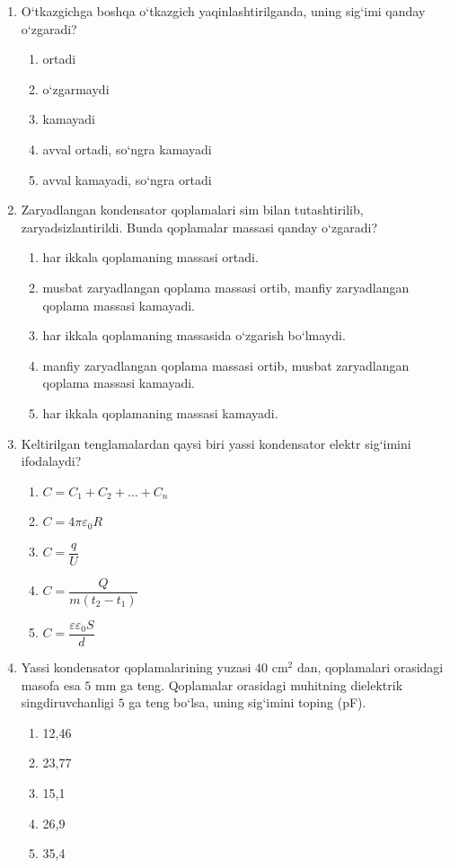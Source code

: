 \begin{enumerate}
\item O‘tkazgichga boshqa o‘tkazgich yaqinlashtirilganda, uning sig‘imi qanday o‘zgaradi?
\begin{enumerate}[label=\Alph*)]
\item ortadi
\item o‘zgarmaydi
\item kamayadi
\item avval ortadi, so‘ngra kamayadi
\item avval kamayadi, so‘ngra ortadi
\end{enumerate}

\item Zaryadlangan kondensator qoplamalari sim bilan tutashtirilib, zaryadsizlantirildi. Bunda qoplamalar massasi qanday o‘zgaradi?
\begin{enumerate}[label=\Alph*)]
\item har ikkala qoplamaning massasi ortadi.
\item musbat zaryadlangan qoplama massasi ortib, manfiy zaryadlangan qoplama massasi kamayadi.
\item har ikkala qoplamaning massasida o‘zgarish bo‘lmaydi.
\item manfiy zaryadlangan qoplama massasi ortib, musbat zaryadlangan qoplama massasi kamayadi.
\item har ikkala qoplamaning massasi kamayadi.
\end{enumerate}

\item Keltirilgan tenglamalardan qaysi biri yassi kondensator elektr sig‘imini ifodalaydi?
\begin{enumerate}[label=\Alph*)]
\item $C=C_1+C_2+\ldots+C_n$
\item $C=4\pi\varepsilon_0R$
\item $C=\dfrac{q}{U}$
\item $C=\dfrac{Q}{m(t_2-t_1)}$
\item $C=\dfrac{\varepsilon\varepsilon_0S}{d}$
\end{enumerate}

\item Yassi kondensator qoplamalarining yuzasi $40$ cm$^2$ dan, qoplamalari orasidagi masofa esa $5$ mm ga teng. Qoplamalar orasidagi muhitning dielektrik singdiruvchanligi $5$ ga teng bo‘lsa, uning sig‘imini toping (pF).
\begin{enumerate}[label=\Alph*)]
\item 12,46
\item 23,77
\item 15,1
\item 26,9
\item 35,4
\end{enumerate}


\end{enumerate}
